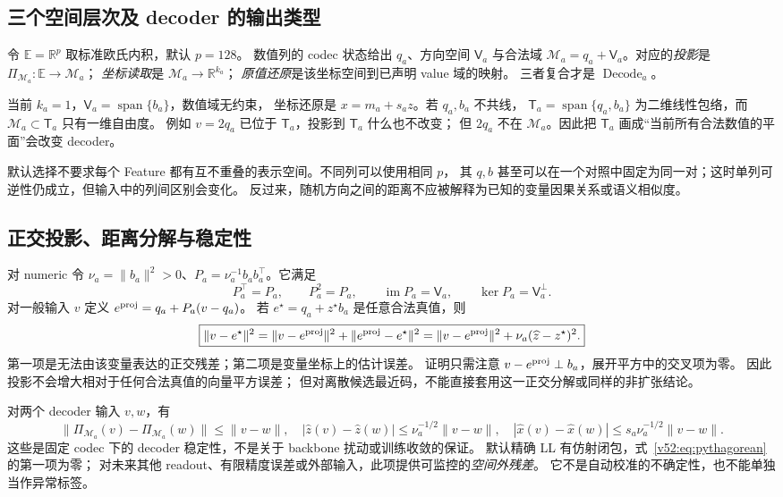 \documentclass[11pt,UTF8,fontset=fandol]{ctexart}
\numberwithin{equation}{section}
\theoremstyle{definition}
\begin{document}
\subsection{三个空间层次及 decoder 的输出类型}
令 $\mathbb E=\mathbb R^p$ 取标准欧氏内积，默认 $p=128$。
数值列的 codec 状态给出 $q_a$、方向空间 $\mathsf V_a$ 与合法域
$\mathcal M_a=q_a+\mathsf V_a$。对应的\emph{投影}是
$\Pi_{\mathcal M_a}:\mathbb E\to\mathcal M_a$；
\emph{坐标读取}是 $\mathcal M_a\to\mathbb R^{k_a}$；
\emph{原值还原}是该坐标空间到已声明 value 域的映射。
三者复合才是 $\operatorname{Decode}_a$。

当前 $k_a=1$，$\mathsf V_a=\operatorname{span}\{b_a\}$，数值域无约束，
坐标还原是 $x=m_a+s_az$。若 $q_a,b_a$ 不共线，
$\mathsf T_a=\operatorname{span}\{q_a,b_a\}$ 为二维线性包络，而
$\mathcal M_a\subset\mathsf T_a$ 只有一维自由度。
例如 $v=2q_a$ 已位于 $\mathsf T_a$，投影到 $\mathsf T_a$ 什么也不改变；
但 $2q_a$ 不在 $\mathcal M_a$。因此把 $\mathsf T_a$ 画成“当前所有合法数值的平面”会改变 decoder。

默认选择不要求每个 Feature 都有互不重叠的表示空间。不同列可以使用相同 $p$，
其 $q,b$ 甚至可以在一个对照中固定为同一对；这时单列可逆性仍成立，但输入中的列间区别会变化。
反过来，随机方向之间的距离不应被解释为已知的变量因果关系或语义相似度。

\subsection{正交投影、距离分解与稳定性}
对 numeric 令 $\nu_a=\|b_a\|^2>0$、$P_a=\nu_a^{-1}b_ab_a^\top$。它满足
\begin{equation}
 P_a^\top=P_a,\qquad P_a^2=P_a,\qquad
 \operatorname{im}P_a=\mathsf V_a,\qquad \ker P_a=\mathsf V_a^\perp.
 \label{v52:eq:projector-laws}
\end{equation}
对一般输入 $v$ 定义 $e^{\rm proj}=q_a+P_a(v-q_a)$。
若 $e^\star=q_a+z^\star b_a$ 是任意合法真值，则
\begin{equation}
 \boxed{\|v-e^\star\|^2
 =\|v-e^{\rm proj}\|^2+\|e^{\rm proj}-e^\star\|^2
 =\|v-e^{\rm proj}\|^2+\nu_a(\widehat z-z^\star)^2.}
 \label{v52:eq:pythagorean}
\end{equation}
第一项是无法由该变量表达的正交残差；第二项是变量坐标上的估计误差。
证明只需注意 $v-e^{\rm proj}\perp b_a$，展开平方中的交叉项为零。
因此投影不会增大相对于任何合法真值的向量平方误差；
但对离散候选最近码，不能直接套用这一正交分解或同样的非扩张结论。

对两个 decoder 输入 $v,w$，有
\begin{equation}
 \|\Pi_{\mathcal M_a}(v)-\Pi_{\mathcal M_a}(w)\|\le\|v-w\|,
 \quad |\widehat z(v)-\widehat z(w)|\le\nu_a^{-1/2}\|v-w\|,
 \quad |\widehat x(v)-\widehat x(w)|\le s_a\nu_a^{-1/2}\|v-w\|.
 \label{v52:eq:projection-stability}
\end{equation}
这些是固定 codec 下的 decoder 稳定性，不是关于 backbone 扰动或训练收敛的保证。
默认精确 LL 有仿射闭包，式~\eqref{v52:eq:pythagorean} 的第一项为零；
对未来其他 readout、有限精度误差或外部输入，此项提供可监控的\emph{空间外残差}。
它不是自动校准的不确定性，也不能单独当作异常标签。
\end{document}
